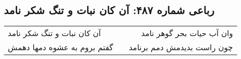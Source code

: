 \begin{center}
\section*{رباعی شماره ۴۸۷: آن کان نبات و تنگ شکر نامد}
\label{sec:0487}
\begin{longtable}{l p{0.5cm} r}
آن کان نبات و تنگ شکر نامد
&&
وان آب حیات بحر گوهر نامد
\\
گفتم بروم به عشوه دمها دهمش
&&
چون راست بدیدمش دمم برنامد
\\
\end{longtable}
\end{center}
